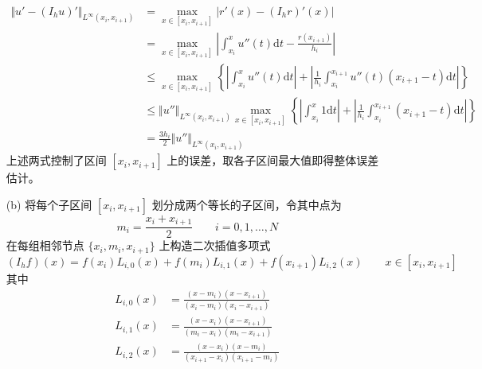 \documentclass[a4paper]{article}
\begin{document}
\begin{enumerate}
\begin{equation}
\begin{aligned}
                \end{aligned}
            \end{equation}
            \begin{equation}
                \begin{aligned}
                    \Vert u'-(I_h u)' \Vert_{L^{\infty}(x_i,x_{i+1})} 
                    &= \max_{x\in [x_i,x_{i+1}]}\left|r'(x)- (I_h r)'(x)\right|\\
                    &= \max_{x\in [x_i,x_{i+1}]}\left|\int_{x_i}^{x}u''(t)\text{d}t-\frac{r(x_{i+1})}{h_i}\right|\\
                    &\leq \max_{x\in [x_i,x_{i+1}]}\left\{
                        \left|\int_{x_i}^{x}u''(t)\text{d}t\right|
                        +\left|\frac{1}{h_i}\int_{x_i}^{x_{i+1}}u''(t)(x_{i+1}-t)\text{d}t\right|
                    \right\}\\
                    &\leq \Vert u''\Vert_{L^{\infty}(x_i,x_{i+1})} \max_{x\in [x_i,x_{i+1}]}\left\{
                        \left|\int_{x_i}^{x}1\text{d}t\right|
                    +\left|\frac{1}{h_i}\int_{x_i}^{x_{i+1}}(x_{i+1}-t)\text{d}t\right|
                    \right\}\\
                    &= \frac{3h_i}{2} \Vert u''\Vert_{L^{\infty}(x_i,x_{i+1})}
                \end{aligned}
            \end{equation}
            上述两式控制了区间 $[x_i,x_{i+1}]$ 上的误差，取各子区间最大值即得整体误差估计。
    \item[(b)] 将每个子区间 $[x_i, x_{i+1}]$ 划分成两个等长的子区间，令其中点为
            \begin{equation}
                m_i = \frac{x_i+x_{i+1}}{2} \qquad i=0,1,\ldots,N
            \end{equation}
            在每组相邻节点 $\{x_i, m_i, x_{i+1}\}$ 上构造二次插值多项式
            \begin{equation}
                (I_h f)(x) = f(x_i)L_{i,0}(x) + f(m_i)L_{i,1}(x) + f(x_{i+1})L_{i,2}(x)
                \qquad x\in [x_i, x_{i+1}]
            \end{equation}
            其中
            \begin{align}
                L_{i,0}(x) &= \frac{(x-m_i)(x-x_{i+1}){}}{(x_i-m_i)(x_i-x_{i+1})}\\
                L_{i,1}(x) &= \frac{(x-x_i)(x-x_{i+1}){}}{(m_i-x_i)( m_i-x_{i+1})}\\
                L_{i,2}(x) &= \frac{(x-x_i)(x-m_i)}{(x_{i+1}-x_i)(x_{i+1}-m_i)}

\end{align}
\end{enumerate}
\end{document}
